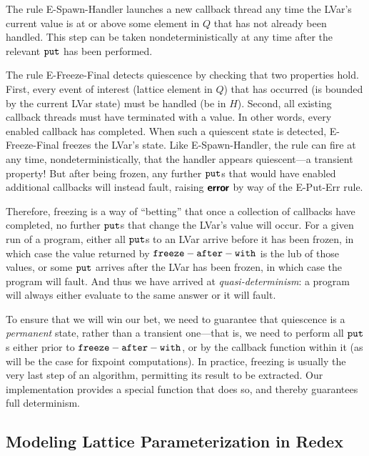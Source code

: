 The rule {\sc E-Spawn-Handler} launches a new callback thread any time the
LVar's current value is at or above some element in $Q$ that has not already been
handled.  This step can be taken nondeterministically at any time after the
relevant $\mbox{\texttt{put}}$ has been performed.

The rule {\sc E-Freeze-Final} detects quiescence by checking that two
properties hold.  First, every event of interest (lattice element in $Q$) that has
occurred (is bounded by the current LVar state) must be handled (be in $H$).
Second, all existing callback threads must have terminated with a value.  In
other words, every enabled callback has completed.  When such a quiescent state
is detected, {\sc E-Freeze-Final} freezes the LVar's state.  Like {\sc
  E-Spawn-Handler}, the rule can fire at any time, nondeterministically, that
the handler appears quiescent---a transient property!  But after being frozen,
any further $\mbox{\texttt{put}}$s that would have enabled additional callbacks will instead
fault, raising $\textbf{\textsf{error}}$ by way of the {\sc E-Put-Err} rule.

Therefore, freezing is a way of ``betting'' that once a collection of callbacks
have completed, no further $\mbox{\texttt{put}}$s that change the LVar's value will occur.  For
a given run of a program, either all $\mbox{\texttt{put}}$s to an LVar arrive before it has
been frozen, in which case the value returned by ${\mbox{\texttt{freeze}}-\mbox{\texttt{after}}-\mbox{\texttt{with}}}$ is the lub of those
values, or some $\mbox{\texttt{put}}$ arrives after the LVar has been frozen, in which case the
program will fault.  And thus we have arrived at \emph{quasi-determinism}: a
program will always either evaluate to the same answer or it will fault.

To ensure that we will win our bet, we need to guarantee that quiescence is a
\emph{permanent} state, rather than a transient one---that is, we need to
perform all $\mbox{\texttt{put}}$s either prior to ${\mbox{\texttt{freeze}}-\mbox{\texttt{after}}-\mbox{\texttt{with}}}$, or by the callback function within it
(as will be the case for fixpoint computations).  In practice, freezing is
usually the very last step of an algorithm, permitting its result to be
extracted. Our implementation provides a special 
function that does so, and thereby guarantees full determinism.


\subsection{Modeling Lattice Parameterization in Redex}\label{subsection:redex}

